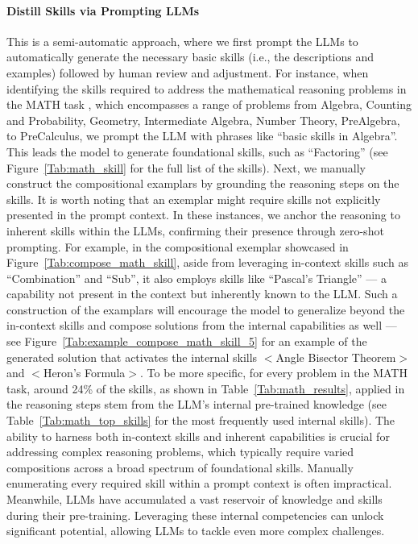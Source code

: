 \paragraph{Distill Skills via Prompting LLMs} 
This is a semi-automatic approach, where we first prompt the LLMs to automatically generate the necessary basic skills (i.e., the descriptions and examples) followed by human review and adjustment. For instance, when identifying the skills required to address the mathematical reasoning problems in the MATH task \citep{hendrycks2021measuring}, which encompasses a range of problems from Algebra, Counting and Probability, Geometry, Intermediate Algebra, Number Theory, PreAlgebra, to PreCalculus, we prompt the LLM with phrases like ``basic skills in Algebra''. This leads the model to generate foundational skills, such as ``Factoring'' (see Figure~\ref{Tab:math_skill} for the full list of the skills). Next, we manually construct the compositional examplars by grounding the reasoning steps on the skills. It is worth noting that an exemplar might require skills not explicitly presented in the prompt context. In these instances, we anchor the reasoning to inherent skills within the LLMs, confirming their presence through zero-shot prompting. For example, in the compositional exemplar showcased in Figure~\ref{Tab:compose_math_skill}, aside from leveraging in-context skills such as ``Combination'' and ``Sub'', it also employs skills like ``Pascal's Triangle'' --- a capability not present in the context but inherently known to the LLM. Such a construction of the examplars will encourage the model to generalize beyond the in-context skills and compose solutions from the internal capabilities as well --- see Figure~\ref{Tab:example_compose_math_skill_5} for an example of the generated solution that activates the internal skills $<$Angle Bisector Theorem$>$ and $<$Heron's Formula$>$. To be more specific, for every problem in the MATH task, around 24\% of the skills, as shown in Table~\ref{Tab:math_results}, applied in the reasoning steps stem from the LLM's internal pre-trained knowledge (see Table~\ref{Tab:math_top_skills} for the most frequently used internal skills). The ability to harness both in-context skills and inherent capabilities is crucial for addressing complex reasoning problems, which typically require varied compositions across a broad spectrum of foundational skills. Manually enumerating every required skill within a prompt context is often impractical. Meanwhile, LLMs have accumulated a vast reservoir of knowledge and skills during their pre-training. Leveraging these internal competencies can unlock significant potential, allowing LLMs to tackle even more complex challenges. 



